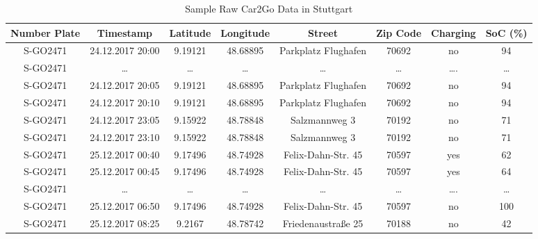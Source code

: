 \documentclass[a4paper, 12pt]{article}
\begin{document}
\begin{table}
    \caption{Sample Raw Car2Go Data in Stuttgart \label{table-car2go-raw}}
    \centering
    \begin{tabular}{c|ccccccc}
      \hline
      \hline
      Number Plate & Timestamp & Latitude & Longitude & Street & Zip Code & Charging & SoC (\%)\\
      \hline
      S-GO2471 & 24.12.2017 20:00 & 9.19121 & 48.68895 & Parkplatz Flughafen & 70692 & no & 94\\
      S-GO2471 & \ldots{} & \ldots{} & \ldots{} & \ldots{} & \ldots{} & \ldots{}. & \ldots{}\\
      S-GO2471 & 24.12.2017 20:05 & 9.19121 & 48.68895 & Parkplatz Flughafen & 70692 & no & 94\\
      S-GO2471 & 24.12.2017 20:10 & 9.19121 & 48.68895 & Parkplatz Flughafen & 70692 & no & 94\\
      S-GO2471 & 24.12.2017 23:05 & 9.15922 & 48.78848 & Salzmannweg 3 & 70192 & no & 71\\
      S-GO2471 & 24.12.2017 23:10 & 9.15922 & 48.78848 & Salzmannweg 3 & 70192 & no & 71\\
      S-GO2471 & 25.12.2017 00:40 & 9.17496 & 48.74928 & Felix-Dahn-Str. 45 & 70597 & yes & 62\\
      S-GO2471 & 25.12.2017 00:45 & 9.17496 & 48.74928 & Felix-Dahn-Str. 45 & 70597 & yes & 64\\
      S-GO2471 & \ldots{} & \ldots{} & \ldots{} & \ldots{} & \ldots{} & \ldots{}. & \ldots{}\\
      S-GO2471 & 25.12.2017 06:50 & 9.17496 & 48.74928 & Felix-Dahn-Str. 45 & 70597 & no & 100\\
      S-GO2471 & 25.12.2017 08:25 & 9.2167 & 48.78742 & Friedenaustraße 25 & 70188 & no & 42\\
      \hline
      \hline
    \end{tabular}

    \bigskip\bigskip  %


\end{table}
\end{document}
